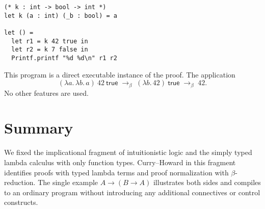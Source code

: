 \begin{verbatim}
(* k : int -> bool -> int *)
let k (a : int) (_b : bool) = a

let () =
  let r1 = k 42 true in
  let r2 = k 7 false in
  Printf.printf "%d %d\n" r1 r2
\end{verbatim}

This program is a direct executable instance of the proof. The application
\[
(\lambda a.\,\lambda b.\,a)\ 42\ \mathsf{true} \;\to_\beta\; (\lambda b.\,42)\ \mathsf{true} \;\to_\beta\; 42.
\]
No other features are used.

\section{Summary}
We fixed the implicational fragment of intuitionistic logic and the simply typed lambda calculus with only function types. Curry--Howard in this fragment identifies proofs with typed lambda terms and proof normalization with $\beta$-reduction. The single example $A \to (B \to A)$ illustrates both sides and compiles to an ordinary program without introducing any additional connectives or control constructs.
